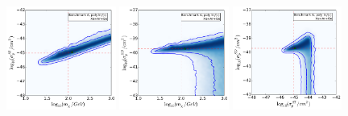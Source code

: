 \begin{figure}[pht!]
  \centering
  \includegraphics[trim=0.2cm 0.2cm 0.2cm 0.2cm, clip,width=0.32\textwidth]{NT/BenchmarkA_poly_noIC-mx_sigsi.pdf}
  \includegraphics[trim=0.2cm 0.2cm 0.2cm 0.2cm, clip,width=0.32\textwidth]{NT/BenchmarkA_poly_noIC-mx_sigsd.pdf}
  \includegraphics[trim=0.2cm 0.2cm 0.2cm 0.2cm, clip,width=0.32\textwidth]{NT/BenchmarkA_poly_noIC-sigsi_sigsd.pdf}


\end{figure}
